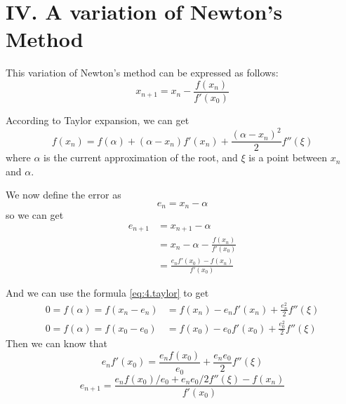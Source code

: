\documentclass[a4paper]{article}
\begin{document}
\section*{IV. A variation of Newton's Method}

This variation of Newton's method can be expressed as follows:
\begin{equation}
    x_{n + 1} = x_n - \frac{f(x_n)}{f'(x_0)}
    \label{eq:4.variation}
\end{equation}

According to Taylor expansion, we can get 
\begin{equation}
    f(x_n) = f(\alpha) + (\alpha - x_n)f'(x_n) + \frac{(\alpha - x_n)^2}{2} f''(\xi)
    \label{eq:4.taylor}
\end{equation}
where $\alpha$ is the current approximation of the root, and $\xi$ is a point between $x_n$ and $\alpha$.

We now define the error as 
\begin{equation}
    e_n = x_n - \alpha
    \label{eq:4.error}
\end{equation}
so we can get
\begin{equation}
    \begin{aligned}
        e_{n + 1} &= x_{n + 1} - \alpha \\
        &= x_n - \alpha - \frac{f(x_n)}{f'(x_0)} \\
        &= \frac{e_n f'(x_0) - f(x_n)}{f'(x_0)}
        \label{eq:4.variation_error}
    \end{aligned}  
\end{equation}


And we can use the formula \ref{eq:4.taylor} to get
\begin{equation}
    \begin{aligned}
        0 = f(\alpha) = f(x_n - e_n) &= f(x_n) - e_n f'(x_n) + \frac{e_n^2}{2} f''(\xi) \\
        0 = f(\alpha) = f(x_0 - e_0) &= f(x_0) - e_0 f'(x_0) + \frac{e_0^2}{2} f''(\xi) 
    \end{aligned}
    \label{eq:4.variation_taylor}
\end{equation}
Then we can know that 
\begin{equation}
    e_n f'(x_0) = \frac{e_n f(x_0)}{e_0} + \frac{e_n e_0}{2} f''(\xi)
    \label{eq:4.variation_error_formula}
\end{equation}
\begin{equation}
    e_{n + 1} = \frac{e_n f(x_0)/e_0 + e_n e_0/2 f''(\xi) - f(x_n)}{f'(x_0)}
    \label{eq:4.variation_error_final}
\end{equation}
\end{document}

